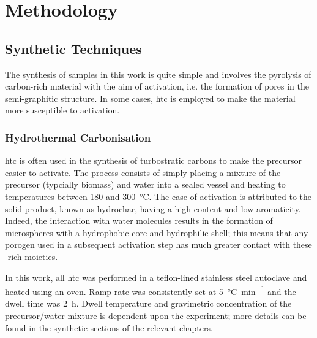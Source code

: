 \chapter{Methodology}
\label{ch:methodology}

\newpage
\section{Synthetic Techniques}
The synthesis of samples in this work is quite simple and involves the \gls{pyrolysis} of carbon-rich material with the aim of \gls{activation}, i.e. the formation of pores in the semi-graphitic structure. In some cases, \gls{htc} is employed to make the material more susceptible to \gls{activation}.

\subsection{Hydrothermal Carbonisation}
\Gls{htc} is often used in the synthesis of \glspl{turbostratic carbon} to make the precursor easier to activate. The process consists of simply placing a mixture of the precursor (typcially biomass) and water into a sealed vessel and heating to temperatures between 180 and \qty{300}{\degreeCelsius}. The ease of activation is attributed to the solid product, known as \gls{hydrochar}, having a high  content and low aromaticity.\citep{Sevilla2011Hydrothermal, Sevilla2009Chemical, Sevilla2009a} Indeed, the interaction with water molecules results in the formation of microspheres with a hydrophobic core and hydrophilic shell; this means that any \gls{porogen} used in a subsequent activation step has much greater contact with these -rich moieties. 

In this work, all \gls{htc} was performed in a teflon-lined stainless steel autoclave and heated using an oven. Ramp rate was consistently set at \qty{5}{\degreeCelsius\per\minute} and the dwell time was \qty{2}{\hour}. Dwell temperature and gravimetric concentration of the precursor/water mixture is dependent upon the experiment; more details can be found in the synthetic sections of the relevant chapters.

